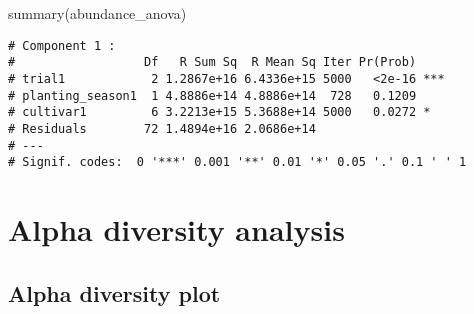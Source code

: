 \documentclass[
]{article}
\newenvironment{Shaded}{\begin{snugshade}}{\end{snugshade}}
\newcommand{\FunctionTok}[1]{\textcolor[rgb]{0.00,0.00,0.00}{#1}}
\newcommand{\NormalTok}[1]{#1}
\begin{document}
\begin{Shaded}
\begin{Highlighting}[]
\FunctionTok{summary}\NormalTok{(abundance\_anova)}
\end{Highlighting}
\end{Shaded}

\begin{verbatim}
# Component 1 :
#                  Df   R Sum Sq  R Mean Sq Iter Pr(Prob)    
# trial1            2 1.2867e+16 6.4336e+15 5000   <2e-16 ***
# planting_season1  1 4.8886e+14 4.8886e+14  728   0.1209    
# cultivar1         6 3.2213e+15 5.3688e+14 5000   0.0272 *  
# Residuals        72 1.4894e+16 2.0686e+14                  
# ---
# Signif. codes:  0 '***' 0.001 '**' 0.01 '*' 0.05 '.' 0.1 ' ' 1
\end{verbatim}

\hypertarget{alpha-diversity-analysis-1}{%
\section{Alpha diversity analysis}\label{alpha-diversity-analysis-1}}

\hypertarget{alpha-diversity-plot-1}{%
\subsection{Alpha diversity plot}\label{alpha-diversity-plot-1}}
\end{document}
